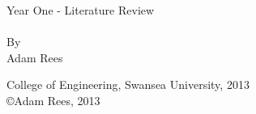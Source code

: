 \begin{titlepage}
\begin{center}
\thispagestyle{plain}
 \setcounter{page}{1}

\begin{doublespace}

\vspace*{\fill}
\LARGE
Year One - Literature Review\\~\\By\\Adam Rees
\end{doublespace}

\vfill
\large
College of Engineering, Swansea University, 2013\\
\copyright Adam Rees, 2013

\end{center}
\end{titlepage}